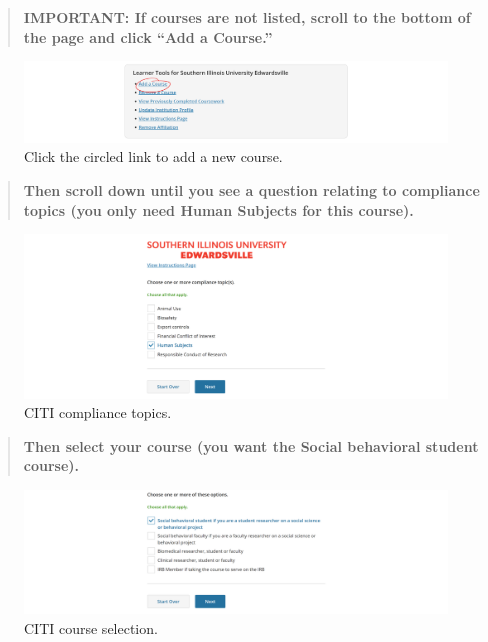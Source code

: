 \documentclass[
]{book}
\begin{document}
\begin{quote}
\textbf{IMPORTANT: If courses are not listed, scroll to the bottom of the page and click ``Add a Course.''}
\end{quote}

\begin{figure}
\centering
\includegraphics[width=1\textwidth,height=\textheight]{images/citi-add-a-course.png}
\caption{Click the circled link to add a new course.}
\end{figure}

\begin{quote}
\textbf{Then scroll down until you see a question relating to compliance topics (you only need Human Subjects for this course).}
\end{quote}

\begin{figure}
\centering
\includegraphics[width=1\textwidth,height=\textheight]{images/citi-topics.png}
\caption{CITI compliance topics.}
\end{figure}

\begin{quote}
\textbf{Then select your course (you want the Social behavioral student course).}
\end{quote}

\begin{figure}
\centering
\includegraphics[width=1\textwidth,height=\textheight]{images/citi-courses.png}
\caption{CITI course selection.}
\end{figure}
\end{document}
